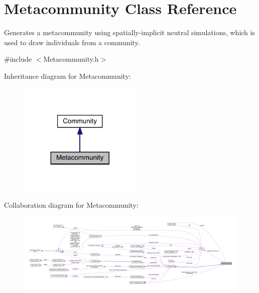 \hypertarget{class_metacommunity}{}\section{Metacommunity Class Reference}
\label{class_metacommunity}


Generates a metacommunity using spatially-\/implicit neutral simulations, which is used to draw individuals from a community.  




{\ttfamily \#include $<$Metacommunity.\+h$>$}



Inheritance diagram for Metacommunity\+:\nopagebreak
\begin{figure}[H]
\begin{center}
\leavevmode
\includegraphics[width=167pt]{class_metacommunity__inherit__graph}
\end{center}
\end{figure}


Collaboration diagram for Metacommunity\+:\nopagebreak
\begin{figure}[H]
\begin{center}
\leavevmode
\includegraphics[width=350pt]{class_metacommunity__coll__graph}
\end{center}
\end{figure}
